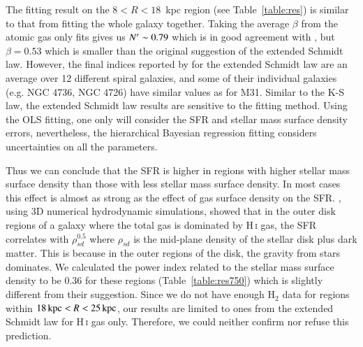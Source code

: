 The fitting result on the $8<R<18$~kpc region (see Table~\ref{table:res}) is similar to that from fitting the whole galaxy together.  Taking the average $\beta$ from the atomic gas only fits gives us $N^\prime \sim 0.79$ which is in good agreement with \citet{Shi11}, but $\beta = 0.53$  which is smaller than the original suggestion of the extended Schmidt law. However, the final indices reported by \citet{Shi11} for  the extended Schmidt law are an average over 12 different spiral galaxies, and some of their individual galaxies (e.g. NGC 4736, NGC 4726) have similar values as for M31.
Similar to the K-S law, the extended Schmidt law results are sensitive to the fitting method. Using the OLS fitting, one only will consider the SFR and stellar mass surface density errors, nevertheless, the hierarchical Bayesian regression fitting considers uncertainties on all the parameters.
 

Thus we can conclude that the SFR is higher in regions with higher stellar mass surface density than those with less stellar mass surface density.
In most cases this effect is almost as strong as the effect of gas surface density on the SFR.
\citet{Kim13}, using 3D numerical hydrodynamic simulations, showed that in the outer disk regions of a galaxy where the total gas is dominated by H\,{\textsc i} gas, the SFR correlates with $\rho_{sd}^{0.5}$ where $\rho_{sd}$ is the mid-plane density of the stellar disk plus dark matter. This is because in the outer regions of the disk, the gravity from stars dominates. 
We calculated the power index related to the stellar mass surface density to be 0.36 for these regions (Table~\ref{table:res750}) which is slightly different from their suggestion. Since we do not have enough H$_2$ data for regions within $18\,{\rm kpc} < R < 25\,{\rm kpc}$, our results are limited to ones from the extended Schmidt law for H\,{\textsc i} gas only. Therefore, we could neither confirm nor refuse this prediction.

